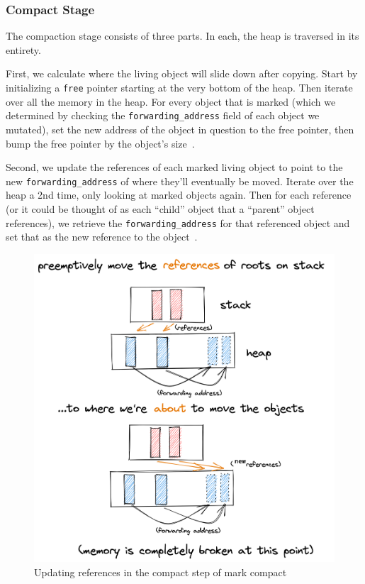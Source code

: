 \documentclass[index]{subfiles}
\begin{document}
\subsubsection{Compact Stage}

The compaction stage consists of three parts. In each, the heap is traversed in its entirety.

First, we calculate where the living object will slide down after copying. Start by initializing a \verb+free+ pointer starting at the very bottom of the heap. Then iterate over all the memory in the heap. For every object that is marked (which we determined by checking the \verb+forwarding_address+ field of each object we mutated), set the new address of the object in question to the free pointer, then bump the free pointer by the object's size~\parencites[Chapter~3]{gc_handbook}[Sections~3.3--3.5]{redhat_openjdk}.

Second, we update the references of each marked living object to point to the new \verb+forwarding_address+ of where they'll eventually be moved. Iterate over the heap a 2nd time, only looking at marked objects again. Then for each reference (or it could be thought of as each ``child'' object that a ``parent'' object references), we retrieve the \verb+forwarding_address+ for that referenced object and set that as the new reference to the object~\parencites[Chapter 3]{gc_handbook}[Sec.~3.4]{redhat_openjdk}.

\begin{figure}[H]
    \centering
    \includegraphics[scale=0.14]{pics/update-references.png}
    \caption{Updating references in the compact step of mark compact}
\end{figure}
\end{document}
